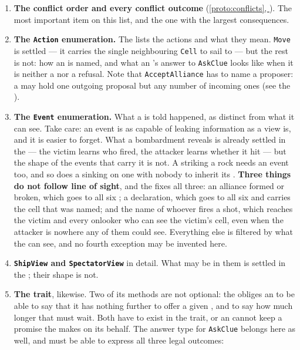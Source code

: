 \documentclass{article}
\newcommand{\fullref}[1]{\hyperref[#1]{\cref*{#1}, \nameref*{#1}}}
\begin{document}
\begin{enumerate}
    \item \textbf{The conflict order and every conflict outcome} (\fullref{proto:conflicts}). The
      most important item on this list, and the one with the largest consequences.
    \item \textbf{The \texttt{Action} enumeration.} The \MD{} lists the actions and what they mean.
      \texttt{Move} is settled --- it carries the single neighbouring \texttt{Cell} to sail to ---
      but the rest is not: how an \island{} is named, and what an \island's answer to
      \texttt{AskClue} looks like when it is neither a \clue{} nor a refusal. Note that
      \texttt{AcceptAlliance} has to name a proposer: a \ship{} may hold one outgoing proposal but
      any number of incoming ones (see the \MD).
    \item \textbf{The \texttt{Event} enumeration.} What a \ship{} is told happened, as distinct from
      what it can see. Take care: an event is as capable of leaking information as a view is, and it
      is easier to forget. What a bombardment reveals is already settled in the \MD{} --- the
      victim learns who fired, the attacker learns whether it hit --- but the shape of the events
      that carry it is not. A \ship{} striking a rock needs an event too, and so does a \ship{}
      sinking on one with nobody to inherit its \clues{}. \textbf{Three things do not follow line
      of sight}, and the \MD{} fixes all three: an alliance formed or broken, which goes to all
      six \ships; a declaration, which goes to all six and carries the cell that was named; and
      the name of whoever fires a shot, which reaches the victim and every onlooker who can see
      the victim's cell, even when the attacker is nowhere any of them could see. Everything else
      is filtered by what the \ship{} can see, and no fourth exception may be invented here.
    \item \textbf{\texttt{ShipView} and \texttt{SpectatorView}} in detail. What may be in them is
      settled in the \MD; their shape is not.
    \item \textbf{The \island{} trait}, likewise. Two of its methods are not optional: the \MD{}
      obliges an \island{} to be able to say that it has nothing further to offer a given \ship,
      and to say how much longer that \ship{} must wait. Both have to exist in the trait, or an
      \island{} cannot keep a promise the \MD{} makes on its behalf. The answer type for
      \texttt{AskClue} belongs here as well, and must be able to express all three legal outcomes:

\end{enumerate}
\end{document}
